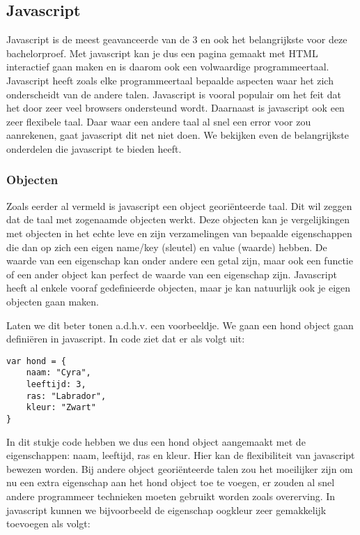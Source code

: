 \subsection{Javascript}
\label{subsec:Web VR}
Javascript is de meest geavanceerde van de 3 en ook het belangrijkste voor deze bachelorproef. Met javascript kan je dus een pagina gemaakt met HTML interactief gaan maken en is daarom ook een volwaardige programmeertaal. Javascript heeft zoals elke programmeertaal bepaalde aspecten waar het zich onderscheidt van de andere talen. Javascript is vooral populair om het feit dat het door zeer veel browsers ondersteund wordt. Daarnaast is javascript ook een zeer flexibele taal. Daar waar een andere taal al snel een error voor zou aanrekenen, gaat javascript dit net niet doen. We bekijken even de belangrijkste onderdelen die javascript te bieden heeft.

\subsubsection{Objecten}
\label{sssec:objecten}
Zoals eerder al vermeld is javascript een object georiënteerde taal. Dit wil zeggen dat de taal met zogenaamde objecten werkt. Deze objecten kan je vergelijkingen met objecten in het echte leve en zijn verzamelingen van bepaalde eigenschappen die dan op zich een eigen name/key (sleutel) en value (waarde) hebben. De waarde van een eigenschap kan onder andere een getal zijn, maar ook een functie of een ander object kan perfect de waarde van een eigenschap zijn. Javascript heeft al enkele vooraf gedefinieerde objecten, maar je kan natuurlijk ook je eigen objecten gaan maken.

Laten we dit beter tonen a.d.h.v. een voorbeeldje. We gaan een hond object gaan definiëren in javascript. In code ziet dat er als volgt uit:

\begin{lstlisting}[frame=single, caption=Hond object aanmaken]
var hond = {
	naam: "Cyra",
	leeftijd: 3,
	ras: "Labrador",
	kleur: "Zwart"
}
\end{lstlisting}

In dit stukje code hebben we dus een hond object aangemaakt met de eigenschappen: naam, leeftijd, ras en kleur. Hier kan de flexibiliteit van javascript bewezen worden. Bij andere object georiënteerde talen zou het moeilijker zijn om nu een extra eigenschap aan het hond object toe te voegen, er zouden al snel andere programmeer technieken moeten gebruikt worden zoals overerving. In javascript kunnen we bijvoorbeeld de eigenschap oogkleur zeer gemakkelijk toevoegen als volgt:


